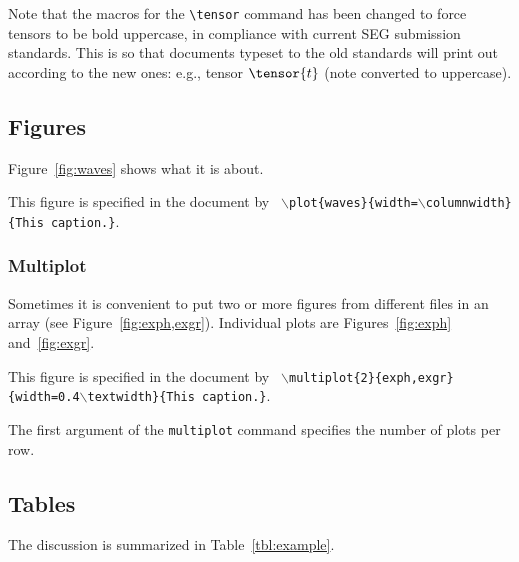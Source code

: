 \documentclass{article}
\begin{document}
Note that the macros for the \verb#\tensor# command has been changed
to force tensors to be bold uppercase, in compliance with current SEG
submission standards. This is so that documents typeset to the old
standards will print out according to the new ones: e.g., tensor
$\tensor{t}$ (note converted to uppercase).

\subsection*{Figures}
\renewcommand{\figdir}{Fig} %

Figure~\ref{fig:waves} shows what it is about.

{This figure is specified in the document by \texttt{
    $\backslash$plot\{waves\}\{width=$\backslash$columnwidth\}\{This caption.\}}.
}

\subsubsection{Multiplot} 

Sometimes it is convenient to put two or
more figures from different files in an array (see
Figure~\ref{fig:exph,exgr}). Individual plots are
Figures~\ref{fig:exph} and~\ref{fig:exgr}.

{This figure is specified in the document by \texttt{
    $\backslash$multiplot\{2\}\{exph,exgr\}\{width=0.4$\backslash$textwidth\}\{This caption.\}}.
}

The first argument of the \texttt{multiplot} command specifies the
number of plots per row.

\subsection{Tables}

The discussion is summarized in Table~\ref{tbl:example}.
\end{document}
